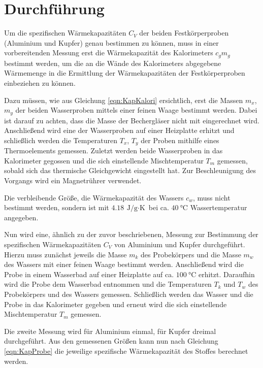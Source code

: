 \section{Durchführung}
\label{sec:Durchführung}

Um die spezifischen Wärmekapazitäten $C_V$ der beiden Festkörperproben (Aluminium und Kupfer)
genau bestimmen zu können,
muss in einer vorbereitenden Messung erst die Wärmekapazität des Kalorimeters $c_gm_g$ bestimmt werden,
um die an die Wände des Kalorimeters abgegebene Wärmemenge in die Ermittlung der Wärmekapazitäten der
Festkörperproben einbeziehen zu können.

Dazu müssen, wie aus Gleichung \ref{eqn:KapKalori} ersichtlich,
erst die Massen $m_x$, $m_y$ der beiden Wasserproben mittels einer feinen Waage bestimmt werden.
Dabei ist darauf zu achten, dass die Masse der Bechergläser nicht mit eingerechnet wird. 
Anschließend wird eine der Wasserproben auf einer Heizplatte erhitzt und schließlich werden die
Temperaturen $T_x$, $T_y$ der Proben mithilfe eines Thermoelements gemessen.
Zuletzt werden beide Wasserproben in das Kalorimeter gegossen und die sich einstellende Mischtemperatur 
$T_m$ gemessen, sobald sich das thermische Gleichgewicht eingestellt hat.
Zur Beschleunigung des Vorgangs wird ein Magnetrührer verwendet.

Die verbleibende Größe, die Wärmekapazität des Wassers $c_w$, muss nicht bestimmt werden, sondern ist mit
$\SI{4.18}{\joule\per\gram\cdot\kelvin}$ bei ca. $\SI{40}{\celsius}$ Wassertemperatur angegeben.


Nun wird eine, ähnlich zu der zuvor beschriebenen, Messung zur Bestimmung der spezifischen Wärmekapazitäten
$C_V$ von Aluminium und Kupfer durchgeführt. Hierzu muss zunächst jeweils die Masse $m_k$ des Probekörpers
und die Masse $m_w$ des Wassers mit einer feinen Waage bestimmt werden.
Anschließend wird die Probe in einem Wasserbad auf einer Heizplatte auf ca. $\SI{100}{\celsius}$ erhitzt. 
Daraufhin wird die Probe dem Wasserbad entnommen und die Temperaturen $T_k$ und $T_w$ des Probekörpers
und des Wassers gemessen.
Schließlich werden das Wasser und die Probe in das Kalorimeter gegeben und erneut wird die sich einstellende
Mischtemperatur $T_m$ gemessen.

Die zweite Messung wird für Aluminium einmal, für Kupfer dreimal durchgeführt. Aus den gemessenen
Größen kann nun nach Gleichung \ref{eqn:KapProbe} die jeweilige spezifische Wärmekapazität des Stoffes
berechnet werden.









